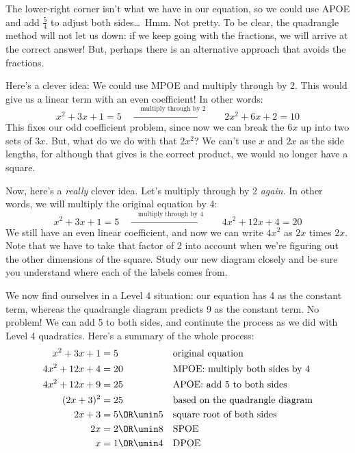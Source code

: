 The lower-right corner isn't what we have in our equation, so we could use APOE and add $\frac{5}{4}$ to adjust both sides\ldots\ Hmm. Not pretty. To be clear, the quadrangle method will not let us down: if we keep going with the fractions, we will arrive at the correct answer! But, perhaps there is an alternative approach that avoids the fractions.

Here's a clever idea: We could use MPOE and multiply through by 2. This would give us a linear term with an even coefficient! In other words:
\[x^2 + 3x + 1 = 5 \quad\xrightarrow{\quad\text{multiply through by 2}\quad}\quad 2x^2 + 6x + 2 = 10\]
This fixes our odd coefficient problem, since now we can break the $6x$ up into two sets of $3x$. But, what do we do with that $2x^2$? We can't use $x$ and $2x$ as the side lengths, for although that gives is the correct product, we would no longer have a square.


Now, here's a \textit{really} clever idea. Let's multiply through by 2 \textit{again}. In other words, we will multiply the original equation by 4:
\[x^2 + 3x + 1 = 5 \quad\xrightarrow{\quad\text{multiply through by 4}\quad}\quad 4x^2 + 12x + 4 = 20\]
We still have an even linear coefficient, and now we can write $4x^2$ as $2x$ times $2x$. Note that we have to take that factor of 2 into account when we're figuring out the other dimensions of the square. Study our new diagram closely and be sure you understand where each of the labels comes from.
\begin{center}
\end{center}

We now find ourselves in a Level 4 situation: our equation has 4 as the constant term, whereas the quadrangle diagram predicts 9 as the constant term. No problem! We can add 5 to both sides, and continute the process as we did with Level 4 quadratics. Here's a summary of the whole process:
\begin{align*}
x^2 + 3x + 1 &= 5
&&\text{original equation}
\\
4x^2 + 12x + 4 &= 20
&&\text{MPOE: multiply both sides by 4}
\\
4x^2 + 12x + 9 &= 25
&&\text{APOE: add 5 to both sides}
\\
(2x+3)^2 &= 25
&&\text{based on the quadrangle diagram}
\\
2x+3 &= 5 \OR \umin5
&&\text{square root of both sides}
\\
2x &= 2 \OR \umin8
&&\text{SPOE}
\\
x &= 1 \OR \umin4
&&\text{DPOE}
\end{align*}

